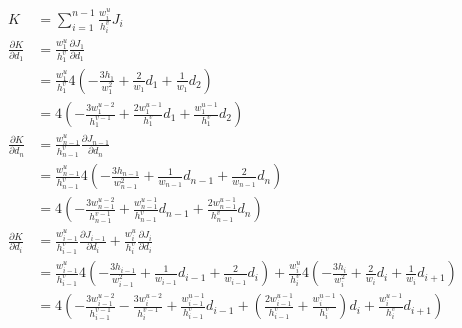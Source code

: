 \documentclass{article}
\begin{document}
\begin{align*}
  K &= \sum_{i=1}^{n-1}\frac{w_i^u}{h_i^v}J_i \\
  \frac{\partial K}{\partial d_1}
  &= \frac{w_1^u}{h_1^v}\frac{\partial J_1}{\partial d_1} \\
  &= \frac{w_1^u}{h_1^v}4\left(-\frac{3h_1}{w_1^2}+\frac{2}{w_1}d_1+\frac{1}{w_1}d_2\right) \\
  &= 4\left(-\frac{3w_1^{u-2}}{h_1^{v-1}}+\frac{2w_1^{u-1}}{h_1^v}d_1+\frac{w_1^{u-1}}{h_1^v}d_2\right) \\
  \frac{\partial K}{\partial d_n}
  &= \frac{w_{n-1}^u}{h_{n-1}^v}\frac{\partial J_{n-1}}{\partial d_n} \\
  &= \frac{w_{n-1}^u}{h_{n-1}^v}4\left(-\frac{3h_{n-1}}{w_{n-1}^2}+\frac{1}{w_{n-1}}d_{n-1}+\frac{2}{w_{n-1}}d_n\right) \\
  &= 4\left(-\frac{3w_{n-1}^{u-2}}{h_{n-1}^{v-1}}+\frac{w_{n-1}^{u-1}}{h_{n-1}^v}d_{n-1}+\frac{2w_{n-1}^{u-1}}{h_{n-1}^v}d_n\right) \\
  \frac{\partial K}{\partial d_i}
  &= \frac{w_{i-1}^u}{h_{i-1}^v}\frac{\partial J_{i-1}}{\partial d_i}
  + \frac{w_i^u}{h_i^v}\frac{\partial J_i}{\partial d_i} \\
  &= \frac{w_{i-1}^u}{h_{i-1}^v}4\left(-\frac{3h_{i-1}}{w_{i-1}^2}+\frac{1}{w_{i-1}}d_{i-1}+\frac{2}{w_{i-1}}d_i\right)
  + \frac{w_i^u}{h_i^v}4\left(-\frac{3h_i}{w_i^2}+\frac{2}{w_i}d_i+\frac{1}{w_i}d_{i+1}\right) \\
  &= 4\left(
  -\frac{3w_{i-1}^{u-2}}{h_{i-1}^{v-1}}-\frac{3w_i^{u-2}}{h_i^{v-1}}
  +\frac{w_{i-1}^{u-1}}{h_{i-1}^v}d_{i-1}
  +\left(\frac{2w_{i-1}^{u-1}}{h_{i-1}^v}+\frac{w_i^{u-1}}{h_i^v}\right)d_i
  +\frac{w_i^{u-1}}{h_i^v}d_{i+1}
  \right)
\end{align*}
\end{document}
